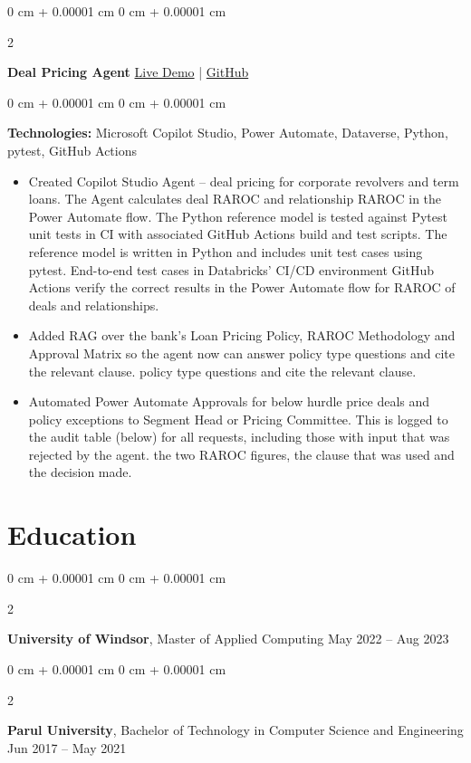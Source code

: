 \documentclass[10pt, letterpaper]{article}
\newenvironment{highlights}{
    \begin{itemize}[
        topsep=0.10 cm,
        parsep=0.10 cm,
        partopsep=0pt,
        itemsep=0pt,
        leftmargin=0 cm + 10pt
    ]
}{
    \end{itemize}
} %
\newenvironment{onecolentry}{
    \begin{adjustwidth}{
        0 cm + 0.00001 cm
    }{
        0 cm + 0.00001 cm
    }
}{
    \end{adjustwidth}
} %
\newenvironment{twocolentry}[2][]{
    \onecolentry
    \def\secondColumn{#2}
    \setcolumnwidth{\fill, 4.5 cm}
    \begin{paracol}{2}
}{
    \switchcolumn \raggedleft \secondColumn
    \end{paracol}
    \endonecolentry
} %
\begin{document}
        \begin{twocolentry}{
            \href{https://deals.inkandinfra.com}{Live Demo} |
            \href{https://github.com/hpk369/northlake-deal-pricing-agent}{GitHub}
        }
            \textbf{Deal Pricing Agent}\end{twocolentry}
        \vspace{0.10 cm}
        \begin{onecolentry}
            \textbf{Technologies:}\> Microsoft Copilot Studio, Power Automate, Dataverse, Python, pytest, GitHub Actions
            \begin{highlights}
                \item Created Copilot Studio Agent – deal pricing for corporate revolvers and term loans. The Agent calculates deal RAROC and relationship RAROC in the Power Automate flow. The Python reference model is tested against Pytest unit tests in CI with associated GitHub Actions build and test scripts. The reference model is written in Python and includes unit test cases using pytest. End-to-end test cases in Databricks’ CI/CD environment GitHub Actions verify the correct results in the Power Automate flow for RAROC of deals and relationships.
                \item Added RAG over the bank’s Loan Pricing Policy, RAROC Methodology and Approval Matrix so the agent now can answer policy type questions and cite the relevant clause. policy type questions and cite the relevant clause.
                \item Automated Power Automate Approvals for below hurdle price deals and policy exceptions to Segment Head or Pricing Committee. This is logged to the audit table (below) for all requests, including those with input that was rejected by the agent. the two RAROC figures, the clause that was used and the decision made.
            \end{highlights}
        \end{onecolentry}

    \section{Education}
        \begin{twocolentry}{
            May 2022 – Aug 2023
        }
            \textbf{University of Windsor}, Master of Applied Computing \end{twocolentry}

        \begin{twocolentry}{
            Jun 2017 – May 2021
        }
            \textbf{Parul University}, Bachelor of Technology in Computer Science and Engineering\end{twocolentry}
\end{document}
